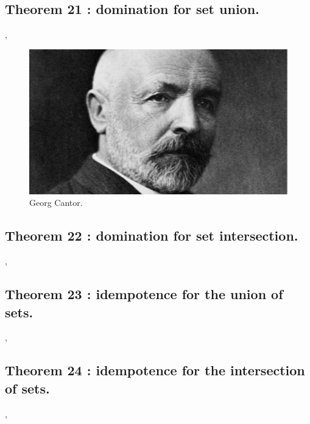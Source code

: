 \documentclass[preview]{standalone}
\begin{document}
\subsection[Domination for set union.]
    {
        \color{section}Theorem 21 \color{black} : domination for set union.
    }

\sep
\begin{figure}[!h]
    \centering
    \includegraphics[width=14cm]{../resources/jpg/2.2.set.operations/georg_cantor.jpg}
    \caption*{Georg Cantor.}
\end{figure}
\pagebreak


\subsection[Domination for set intersection.]
    {
        \color{section}Theorem 22 \color{black} : domination for set intersection.
    }

\sep


\subsection[Idempotence for the union of sets.]
    {
        \color{section}Theorem 23 \color{black} : idempotence for the union of sets.
    }

\sep
\pagebreak


\subsection[Idempotence for the intersection of sets.]
    {
        \color{section}Theorem 24 \color{black} : idempotence for the intersection of sets.
    }

\sep
\end{document}
